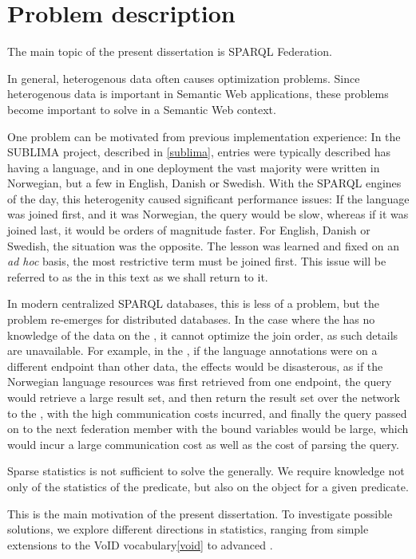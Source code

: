 \section{Problem description}

The main topic of the present dissertation is SPARQL
Federation.

In general, heterogenous data often causes optimization
problems. Since heterogenous data is important in Semantic Web
applications, these problems become important to solve in a Semantic
Web context.

One problem can be motivated from previous implementation experience:
In the SUBLIMA project, described in \ref{sublima}, entries were
typically described has having a language, and in one deployment the
vast majority were written in Norwegian, but a few in English, Danish
or Swedish. With the SPARQL engines of the day, this heterogenity
caused significant performance issues: If the language was joined
first, and it was Norwegian, the query would be slow, whereas if it
was joined last, it would be orders of magnitude faster. For English,
Danish or Swedish, the situation was the opposite. The lesson was
learned and fixed on an \textit{ad hoc} basis, the most restrictive
term must be joined first. This issue will be referred to as the
\langcase in this text as we shall return to it.

In modern centralized SPARQL databases, this is less of a problem, but
the problem re-emerges for distributed databases. In the case where
the \fedeng has no knowledge of the data on the \indendp, it cannot
optimize the join order, as such details are unavailable. For example,
in the \langcase, if the language annotations were on a different
endpoint than other data, the effects would be disasterous, as if the
Norwegian language resources was first retrieved from one endpoint,
the query would retrieve a large result set, and then return the
result set over the network to the \fedeng, with the high
communication costs incurred, and finally the query passed on to the
next federation member with the bound variables would be large, which
would incur a large communication cost as well as the cost of parsing
the query. 

Sparse statistics is not sufficient to solve the \langcase
generally. We require knowledge not only of the statistics of the
predicate, but also on the object for a given predicate.

This is the main motivation of the present dissertation. To investigate
possible solutions, we explore different directions in statistics,
ranging from simple extensions to the VoID vocabulary\ref{void} to
advanced \SRL.